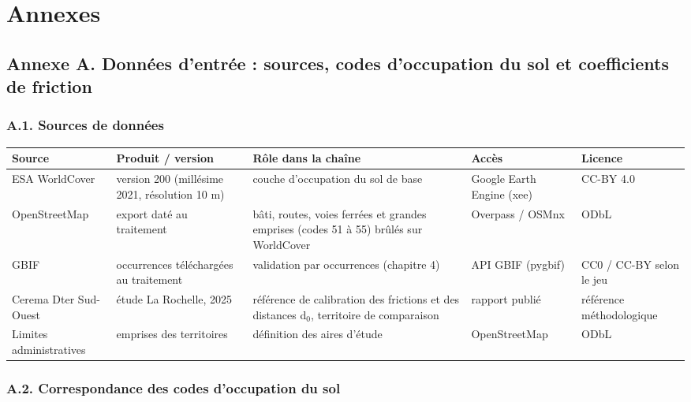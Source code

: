 \documentclass[a4paper,11pt]{report}
\begin{document}
\chapter{Annexes}

\section{Annexe A. Données d'entrée : sources, codes d'occupation du sol et coefficients de friction}\label{annexe:A}

\subsection{A.1. Sources de données}

\begin{table}[H]
\centering
\begin{tabularx}{\textwidth}{>{\raggedright\arraybackslash}X >{\raggedright\arraybackslash}X >{\raggedright\arraybackslash}X >{\raggedright\arraybackslash}X >{\raggedright\arraybackslash}X}
\toprule
\textbf{Source} & \textbf{Produit / version} & \textbf{Rôle dans la chaîne} & \textbf{Accès} & \textbf{Licence} \\
\midrule
ESA WorldCover & version 200 (millésime 2021, résolution 10 m) & couche d'occupation du sol de base & Google Earth Engine (xee) & CC-BY 4.0 \\
OpenStreetMap & export daté au traitement & bâti, routes, voies ferrées et grandes emprises (codes 51 à 55) brûlés sur WorldCover & Overpass / OSMnx & ODbL \\
GBIF & occurrences téléchargées au traitement & validation par occurrences (chapitre 4) & API GBIF (pygbif) & CC0 / CC-BY selon le jeu \\
Cerema Dter Sud-Ouest & étude La Rochelle, 2025 & référence de calibration des frictions et des distances d$_{0}$, territoire de comparaison & rapport publié & référence méthodologique \\
Limites administratives & emprises des territoires & définition des aires d'étude & OpenStreetMap & ODbL \\
\bottomrule
\end{tabularx}
\end{table}

\subsection{A.2. Correspondance des codes d'occupation du sol}
\end{document}
